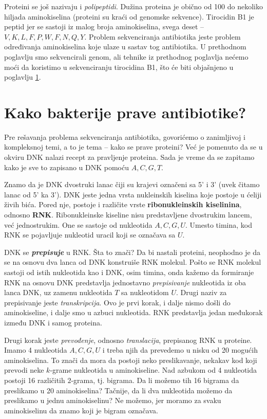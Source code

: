 Proteini se još nazivaju i \textit{polipeptidi}. Dužina proteina je obično od 100 do nekoliko hiljada aminokiselina (proteini su kraći od genomske sekvence). Tirocidin B1 je peptid jer se sastoji iz malog broja aminokiselina, svega deset -- $ V,K,L,F,P,W,F,N,Q,Y$. Problem sekvenciranja antibiotika jeste problem određivanja aminokiselina koje ulaze u sastav tog antibiotika. U prethodnom poglavlju smo sekvencirali genom, ali tehnike iz prethodnog poglavlja nećemo moći da koristimo u sekvenciranju tirocidina B1, što će biti objašnjeno u poglavlju \ref{pravljenje}.


\section{Kako bakterije prave antibiotike?} \label{pravljenje}

Pre rešavanja problema sekvenciranja antibiotika, govorićemo o zanimljivoj i kompleksnoj temi, a to je tema -- kako se prave proteini? Već je pomenuto da se u okviru DNK nalazi recept za pravljenje proteina. Sada je vreme da se zapitamo kako je sve to zapisano u DNK pomoću $A, C, G, T$.

Znamo da je DNK dvostruki lanac čiji su krajevi označeni sa 5' i 3' (uvek čitamo lanac od 5' ka 3'). DNK jeste jedna vrsta nukleinskih kiselina koje postoje u ćeliji živih bića. Pored nje, postoje i različite vrste \textbf{ribonukleinskih kiselinina}, odnosno \textbf{RNK}. Ribonukleinske kiseline nisu predstavljene dvostrukim lancem, već jednostrukim. One se sastoje od nukleotida $A, C, G, U$. Umesto timina, kod RNK se pojavljuje nukleotid uracil koji se označava sa $U$. 

DNK se \textbf{\textit{prepisuje}} u RNK. Šta to znači? Da bi nastali proteini, neophodno je da se na osnovu dva lanca od DNK konstruiše RNK molekul. Pošto se RNK molekul sastoji od istih nukleotida kao i DNK, osim timina, onda kažemo da formiranje RNK na osnovu DNK predstavlja jednostavno \textit{prepisivanje} nukleotida iz oba lanca DNK, uz zamenu nukleotida $T$ sa nukleotidom $U$. Drugi naziv za prepisivanje jeste \textit{transkripcija}. Ovo je prvi korak, i dalje nismo došli do aminokiseline, i dalje smo u azbuci nukleotida. RNK predstavlja jedan međukorak između DNK i samog proteina.

Drugi korak jeste \textit{prevođenje}, odnosno \textit{translacija}, prepisanog RNK u proteine. Imamo 4 nukleotida $A, C, G, U$ i treba njih da prevedemo u nisku od 20 mogućih aminokiselina. To znači da mora da postoji neko preslikavanje, nekakav kod koji prevodi neke $k$-grame nukleotida u aminokiseline. Nad azbukom od 4 nukleotida postoji 16 različitih $2$-grama, tj. bigrama. Da li možemo tih 16 bigrama da preslikamo u 20 aminokiselina? Tačnije, da li dva nukleotida možemo da preslikamo u jednu aminokiselinu? Ne možemo, jer moramo za svaku aminokiselinu da znamo koji je bigram označava. 

